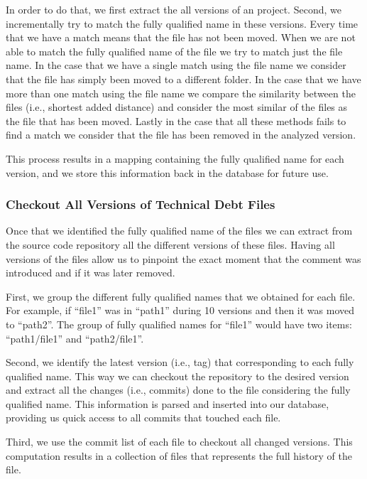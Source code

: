 In order to do that, we first extract the all versions of an project. Second, we incrementally try to match the fully qualified name in these versions. Every time that we have a match means that the file has not been moved. When we are not able to match the fully qualified name of the file we try to match just the file name. In the case that we have a single match using the file name we consider that the file has simply been moved to a different folder. In the case that we have more than one match using the file name we compare the similarity between the files (i.e., shortest added distance) and consider the most similar of the files as the file that has been moved. Lastly in the case that all these methods fails to find a match we consider that the file has been removed in the analyzed version.  

This process results in a mapping containing the fully qualified name for each version, and we store this information back in the database for future use.

\subsubsection*{Checkout All Versions of Technical Debt Files}
\label{subsub:checkout_all_versions_of_technical_debt_files}

Once that we identified the fully qualified name of the \SATD files we can extract from the source code repository all the different versions of these files. Having all versions of the \SATD files allow us to pinpoint the exact moment that the \SATD comment was introduced and if it was later removed.

First, we group the different fully qualified names that we obtained for each file. For example, if ``file1'' was in ``path1'' during 10 versions and then it was moved to ``path2''. The group of fully qualified names for ``file1'' would have two items: ``path1/file1'' and ``path2/file1''. 

Second, we identify the latest version (i.e., tag) that corresponding to each fully qualified name. This way we can checkout the repository to the desired version and extract all the changes (i.e., commits) done to the file considering the fully qualified name. This information is parsed and inserted into our database, providing us quick access to all commits that touched each \SATD file. 

Third, we use the commit list of each \SATD file to checkout all changed versions. This computation results in a collection of files that represents the full history of the \SATD file.  

